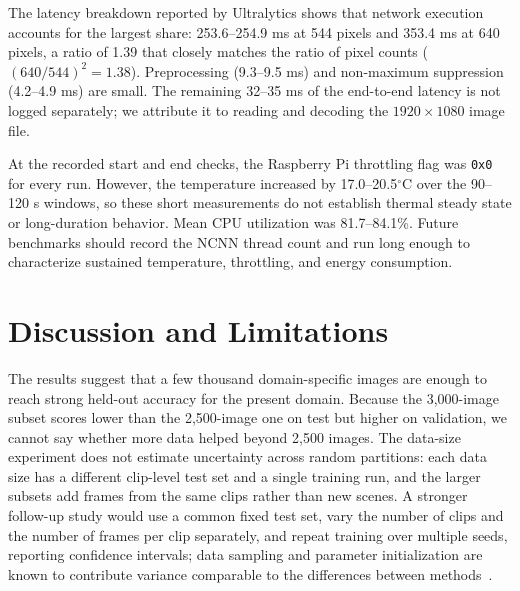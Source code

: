 \documentclass[runningheads]{llncs}
\begin{document}
\begin{table}
\caption{On-device end-to-end NCNN benchmark on Raspberry Pi. Each row uses
300 timed images after five warm-up images. P95 is the 95th-percentile latency.
\label{tab:edge}}
\centering
\small
{}
\end{table}

The latency breakdown reported by Ultralytics shows that network execution
accounts for the largest share: 253.6--254.9 ms at 544 pixels and 353.4 ms at
640 pixels, a ratio of 1.39 that closely matches the ratio of pixel counts
($(640/544)^2=1.38$). Preprocessing (9.3--9.5 ms) and non-maximum suppression
(4.2--4.9 ms) are small. The remaining 32--35 ms of the end-to-end latency is
not logged separately; we attribute it to reading and decoding the
$1920\times1080$ image file.

At the recorded start and end checks, the Raspberry Pi throttling flag was
\texttt{0x0} for every run. However, the temperature increased by
17.0--20.5$^\circ$C over the 90--120 s windows, so these short measurements do
not establish thermal steady state or long-duration behavior. Mean CPU
utilization was 81.7--84.1\%. Future benchmarks should record the NCNN thread
count and run long enough to characterize sustained temperature, throttling,
and energy consumption.

\section{Discussion and Limitations}

The results suggest that a few thousand domain-specific images are enough to
reach strong held-out accuracy for the present domain. Because the
3,000-image subset scores lower than the 2,500-image one on test but higher on
validation, we cannot say whether more data helped beyond 2,500 images. The
data-size
experiment does not estimate uncertainty across random partitions: each data
size has a different clip-level test set and a single training run, and the
larger subsets add frames from the same clips rather than new scenes. A
stronger follow-up study would use a common fixed test set, vary the number of
clips and the number of frames per clip separately, and repeat training over
multiple seeds, reporting confidence intervals; data sampling and parameter
initialization are known to contribute variance comparable to the differences
between methods~\cite{bouthillier2021variance}.
\end{document}
